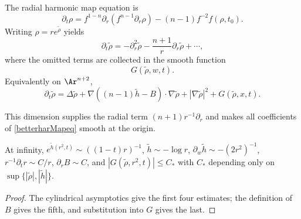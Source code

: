 The radial harmonic map equation is
\begin{equation}\label{eqrothar}
\partial_t\rho=f^{1-n}\partial_r(f^{n-1}\partial_r\rho)-(n-1)f^{-2}f(\rho,t_0).
\end{equation}
Writing $\rho=re^{\tilde\rho}$ yields
\begin{equation}\label{newform}
\partial_t\tilde\rho=-\partial_r^2\tilde\rho-\frac{n+1}{r}\partial_r\tilde\rho+\cdots,
\end{equation}
where the omitted terms are collected in the smooth function
\begin{equation}\label{defofG}G(\tilde\rho,w,t).\end{equation}
Equivalently on $\Ar^{n+2}$,
\begin{equation}\label{betterharMapeq}
\partial_t\tilde\rho=\Delta\tilde\rho+\nabla((n-1)\tilde h-B)\cdot\nabla\tilde\rho+|\nabla\tilde\rho|^2+G(\tilde\rho,x,t).
\end{equation}

\begin{remark}
\label{rem:choice-of-dimension-n-plus-2}
This dimension supplies the radial term $(n+1)r^{-1}\partial_r$ and
makes all coefficients of \eqref{betterharMapeq} smooth at the origin.
\end{remark}

\begin{claim}
\label{claim:harmonic-map-flow-asymptotics}
\label{asympt}
At infinity, $e^{\tilde h(r^2,t)}\sim((1-t)r)^{-1}$,
$\tilde h\sim-\log r$, $\partial_w\tilde h\sim-(2r^2)^{-1}$,
$r^{-1}\partial_tr\sim C/r$, $\partial_rB\sim C$, and
$|G(\tilde\rho,r^2,t)|\le C_*$ with $C_*$ depending only on
$\sup\{|\tilde\rho|,|\tilde h|\}$.
\end{claim}
\begin{proof}
\sketch The cylindrical asymptotics give the first four estimates; the
definition of $B$ gives the fifth, and substitution into $G$ gives the last.
\end{proof}

